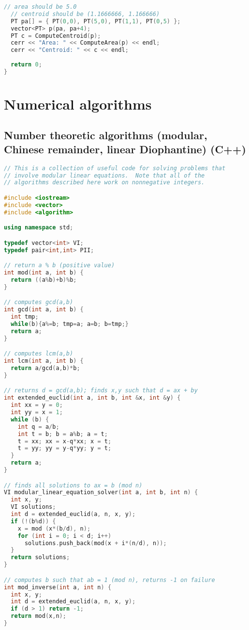 \begin{lstlisting}[language=C++]
  // area should be 5.0
  // centroid should be (1.1666666, 1.166666)
  PT pa[] = { PT(0,0), PT(5,0), PT(1,1), PT(0,5) };
  vector<PT> p(pa, pa+4);
  PT c = ComputeCentroid(p);
  cerr << "Area: " << ComputeArea(p) << endl;
  cerr << "Centroid: " << c << endl;
  
  return 0;
}
\end{lstlisting}
\section{Numerical algorithms}
\subsection{Number theoretic algorithms (modular, Chinese remainder, linear Diophantine) (C++)}
\begin{lstlisting}[language=C++]
// This is a collection of useful code for solving problems that
// involve modular linear equations.  Note that all of the
// algorithms described here work on nonnegative integers.

#include <iostream>
#include <vector>
#include <algorithm>

using namespace std;

typedef vector<int> VI;
typedef pair<int,int> PII;

// return a % b (positive value)
int mod(int a, int b) {
  return ((a%b)+b)%b;
}

// computes gcd(a,b)
int gcd(int a, int b) {
  int tmp;
  while(b){a%=b; tmp=a; a=b; b=tmp;}
  return a;
}

// computes lcm(a,b)
int lcm(int a, int b) {
  return a/gcd(a,b)*b;
}

// returns d = gcd(a,b); finds x,y such that d = ax + by
int extended_euclid(int a, int b, int &x, int &y) {  
  int xx = y = 0;
  int yy = x = 1;
  while (b) {
    int q = a/b;
    int t = b; b = a%b; a = t;
    t = xx; xx = x-q*xx; x = t;
    t = yy; yy = y-q*yy; y = t;
  }
  return a;
}

// finds all solutions to ax = b (mod n)
VI modular_linear_equation_solver(int a, int b, int n) {
  int x, y;
  VI solutions;
  int d = extended_euclid(a, n, x, y);
  if (!(b%d)) {
    x = mod (x*(b/d), n);
    for (int i = 0; i < d; i++)
      solutions.push_back(mod(x + i*(n/d), n));
  }
  return solutions;
}

// computes b such that ab = 1 (mod n), returns -1 on failure
int mod_inverse(int a, int n) {
  int x, y;
  int d = extended_euclid(a, n, x, y);
  if (d > 1) return -1;
  return mod(x,n);
}


\end{lstlisting}
